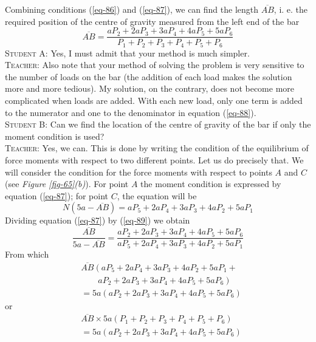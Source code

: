 \documentclass[a4paper,sfsidenotes]{tufte-book}
\begin{document}
Combining conditions (\ref{eq-86}) and (\ref{eq-87}), we can find the length $\overline{AB}$, i. e. the required position of the centre of gravity measured from the left end of the bar
\begin{equation}%
\overline{AB} = \frac{aP_{2} + 2aP_{3} + 3aP_{4} + 4aP_{5} + 5aP_{6}}{P_{1}+P_{2}+P_{3}+P_{4}+P_{5}+P_{6}}
\label{eq-88}
\end{equation}
\textsc{Student A:} Yes, I must admit that your method is much simpler.
\\
\textsc{Teacher:} Also note that your method of solving the problem is very sensitive to the number of loads on the bar (the addition of each load makes the solution more and more tedious). My solution, on the contrary, does not become more complicated when loads are added. With each new load, only
one term is added to the numerator and one to the denominator in equation (\ref{eq-88}).
\\
\textsc{Student B:} Can we find the location of the centre of gravity of the bar if only the moment condition is used?
\\
\textsc{Teacher:} Yes, we can. This is done by writing the condition of the equilibrium of force moments with respect to two different points. Let us do precisely that. We will consider the condition for the force moments with respect to points $A$ and $C$ (see \emph{Figure \ref{fig-65}(b)}). For point $A$ the moment condition is expressed by equation (\ref{eq-87}); for point $C$, the equation will be\\
\begin{equation}%
N (5a-\overline{AB}) = aP_{5}+ 2aP_{4} + 3aP_{3} + 4aP_{2} + 5aP_{1}
\label{eq-89}
\end{equation}
Dividing equation (\ref{eq-87}) by (\ref{eq-89}) we obtain 
\begin{equation*}%
\frac{\overline{AB}}{5a - \overline{AB}} = \frac{aP_{2} + 2aP_{3} + 3aP_{4} + 4aP_{5} + 5aP_{6}
}{aP_{5}+ 2aP_{4} + 3aP_{3} + 4aP_{2} + 5aP_{1}}
\end{equation*}
From which
\begin{align*}
&  \overline{AB} \left( aP_{5}+ 2aP_{4} + 3aP_{3} + 4aP_{2} + 5aP_{1} + \right. \\
&\qquad  \left. aP_{2} + 2aP_{3} + 3aP_{4} + 4aP_{5} + 5aP_{6} \right) \\
& = 5a \left( aP_{2} + 2aP_{3} + 3aP_{4} + 4aP_{5} + 5aP_{6} \right)
\end{align*}
or
\begin{equation*}%
\begin{split}
& \overline{AB} \times 5a \left(P_{1}+P_{2}+P_{3}+P_{4}+P_{5}+P_{6} \right)\\
& = 5a \left( aP_{2} + 2aP_{3} + 3aP_{4} + 4aP_{5} + 5aP_{6} \right)
\end{split}
\end{equation*}
\end{document}
